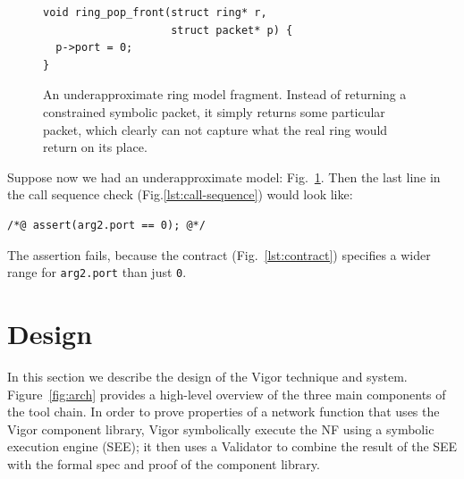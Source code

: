 \documentclass[letterpaper,twocolumn,10pt]{article}
\newcommand{\code}[1]{\lstinline{#1}}
\begin{document}
\begin{figure}[h!]
\begin{lstlisting}
void ring_pop_front(struct ring* r,
                    struct packet* p) {
  p->port = 0;
}
\end{lstlisting}
  \caption{An underapproximate ring model fragment. Instead of returning a
    constrained symbolic packet, it simply returns some particular packet, which
    clearly can not capture what the real ring would return on its place.}
  \label{lst:underapproximate}
\end{figure}

Suppose now we had an underapproximate model: Fig.~\ref{lst:underapproximate}.
Then the last line in the call sequence check (Fig.\ref{lst:call-sequence}) would look like:
\begin{lstlisting}
/*@ assert(arg2.port == 0); @*/
\end{lstlisting}
The assertion fails, because the contract (Fig.~\ref{lst:contract}) specifies
a wider range for \code{arg2.port} than just \code{0}.




\section{Design}
\label{sec:design}

In this section we describe the design of the Vigor technique and system.
Figure~\ref{fig:arch} provides a high-level overview of the three main
components of the tool chain. In order to prove properties of a network function
that uses the Vigor component library, Vigor symbolically execute the NF using a
symbolic execution engine (SEE); it then uses a Validator to combine the result
of the SEE with the formal spec and proof of the component library.
\end{document}
